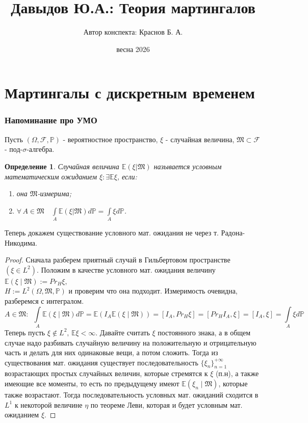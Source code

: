 \documentclass[12pt,a4paper]{article} %
\author{Автор конспекта: Краснов Б. А.}
\title{Давыдов Ю.А.: Теория мартингалов}
\date{весна 2026}
\newtheorem{definition}{Определение}
\newcommand{\E}{\mathbb{E}}
\newcommand{\PR}{\mathbb{P}}
\newcommand{\F}{\mathcal{F}}
\newcommand{\M}{\mathfrak{M}}
\begin{document}
	\maketitle
	\tableofcontents
	\clearpage
	\part{Мартингалы с дискретным временем}
	\section{Напоминание про УМО}
	Пусть $(\Omega,\F,\PR)$ - вероятностное пространство, $\xi$ - случайная величина, $\mathfrak{M}\subset\F$ - под-$\sigma$-алгебра.
	\begin{definition}
		Случайная величина $\E(\xi\vert\mathfrak{M})$ называется условным математическим ожиданием $\xi:\exists\E\xi$, если:
		\begin{enumerate}
			\item она $\mathfrak{M}$-измерима;
			\item $\forall\,A\in\mathfrak{M}\quad\displaystyle\int\limits_A\E(\xi\vert\mathfrak{M})d\PR=\int\limits_A\xi d\PR$.
		\end{enumerate}
	\end{definition}
	Теперь докажем существование условного мат. ожидания не через т. Радона-Никодима.
	\begin{proof}
		Сначала разберем приятный случай в Гильбертовом пространстве\\ $(\xi\in L^2)$. Положим в качестве условного мат. ожидания величину $\E(\xi\mid\M):=Pr_H\xi,$\\$H:=L^2(\Omega,\M,\PR)$ и проверим что она подходит. Измеримость очевидна, разберемся с интегралом.
		$$A\in\M:\,\,\,\int\limits_A\E(\xi\mid\M)d\PR=\E(I_A\E(\xi\mid\M))=[I_A,Pr_H\xi]=[Pr_HI_A,\xi]=[I_A,\xi]=\int\limits_A\xi d\PR$$
		Теперь пусть $\xi\notin L^2,\,\E\xi<\infty$. Давайте считать $\xi$ постоянного знака, а в общем случае надо разбивать случайную величину на положительную и отрицательную часть и делать для них одинаковые вещи, а потом сложить. Тогда из существования мат. ожидания существует последовательность $\{\xi_n\}_{n=1}^{+\infty}$ возрастающих простых случайных величин, которые стремятся к $\xi$ (п.н), а также имеющие все моменты, то есть по предыдущему имеют $\E(\xi_n\mid\M)$, которые также возрастают. Тогда последовательность условных мат. ожиданий сходится в $L^1$ к некоторой величине $\eta$ по теореме Леви, которая и будет условным мат. ожиданием $\xi$.
	\end{proof}
\end{document}
